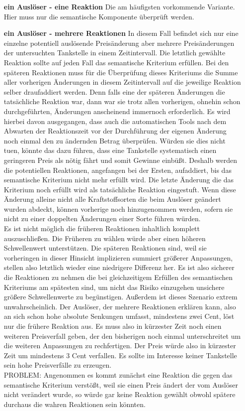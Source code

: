 \documentclass[12pt,a4paper,bibliography=totocnumbered,listof=totocnumbered]{scrartcl}
\begin{document}
\begin{enumerate}
\item [\textbf{ein Auslöser - eine Reaktion}]
Die am häufigsten vorkommende Variante. Hier muss nur die semantische Komponente überprüft werden. 
\item [\textbf{ein Auslöser - mehrere Reaktionen}]
In diesem Fall befindet sich nur eine einzelne potentiell auslösende Preisänderung aber mehrere Preisänderungen der untersuchten Tankstelle in einem Zeitintervall. Die letztlich gewählte Reaktion sollte auf jeden Fall das semantische Kriterium erfüllen. Bei den späteren Reaktionen muss für die Überprüfung dieses Kriteriums die Summe aller vorherigen Änderungen in diesem Zeitintervall auf die jeweilige Reaktion selber draufaddiert werden. Denn falls eine der späteren Änderungen die tatsächliche Reaktion war, dann war sie trotz allen vorherigen, ohnehin schon durchgeführten, Änderungen anscheinend immernoch erforderlich. Es wird hierbei davon ausgegangen, dass auch die automatischen Tools nach dem Abwarten der Reaktionszeit vor der Durchführung der eigenen Änderung noch einmal den zu ändernden Betrag überprüfen. Würden sie dies nicht tuen, könnte das dazu führen, dass eine Tankstelle systematisch einen geringeren Preis als nötig fährt und somit Gewinne einbüßt. Deshalb werden die potentiellen Reaktionen, angefangen bei der Ersten, aufaddiert, bis das semantische Kriterium nicht mehr erfüllt wird. Die letzte Änderung die das Kriterium noch erfüllt wird als tatsächliche Reaktion eingestuft. Wenn diese Änderung alleine nicht alle Kraftstoffsorten die beim Auslöser geändert wurden abdeckt, können vorherige noch hinzugenommen werden, sofern sie nicht zu einer doppelten Änderungen einer Sorte führen würden.\\
Es ist nicht möglich die früheren Reaktionen inhaltlich komplett auszuschließen. Die Früheren zu wählen würde aber einen höheren Schwellenwert unterstützen. Die späteren Reaktionen sind, weil sie vorheringen in dieser Hinsicht implizieren summiert größerer Anpassungen, stellen also letztlich wieder eine niedrigere Differenz her. Es ist also sicherer die Reaktionen zu nehmen die bei gleichzeitigem Erfüllen des semantischen Kriteriums am spätesten sind, um nicht das Risiko einzugehen unsichere größere Schwellenwerte zu begünstigen. Außerdem ist dieses Szenario extrem unwahrscheinlich. Der Auslöser, der mehrere Reaktionen erklären kann, also an sich schon hohe absolute Senkungen umfasst, mindestens zwei Cent, löst nur die frühere Reaktion aus. Es muss also in kürzester Zeit noch einen weiteren Preisverfall geben, der den bisherigen noch einmal unterschreitet um die weiteren Anpassungen zu rechfertigen. Der Preis würde also in kürzester Zeit um mindestens 3 Cent verfallen. Es sollte im Interesse keiner Tankstelle sein hohe Preisverfälle zu erzeugen.\\
PROBLEM: Angenommen es kommt zunächst eine Reaktion die gegen das semantische Kriterium verstößt, weil sie einen Preis ändert der vom Auslöser nicht verändert wurde, so würde gar keine Reaktion gewählt obwohl spätere durchaus die wahren Reaktionen sein könnten.


\end{enumerate}
\end{document}
